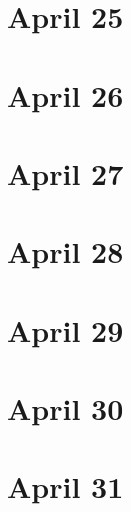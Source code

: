 \section{April 25}

\section{April 26}

\section{April 27}

\section{April 28}

\section{April 29}

\section{April 30}

\section{April 31}

